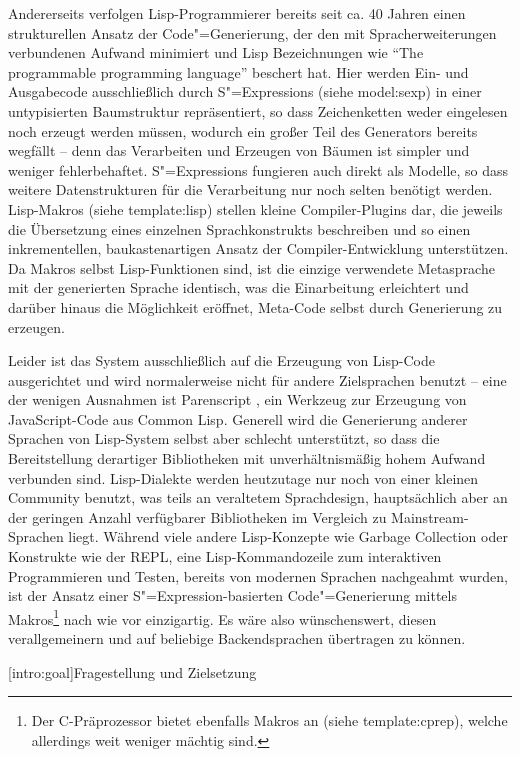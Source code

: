 \documentclass[12pt, a4paper, bibgerm]{scrbook}
\newcommand\lsection{}
\newcommand\sref{}
\newcommand{\sees}[1]{(siehe \sref{#1})}
\newcommand{\sexp}{S"=Expression}
\newcommand{\sexps}{S"=Expressions}
\newcommand{\cgen}{Code"=Generierung}
\begin{document}
Andererseits verfolgen Lisp-Programmierer bereits seit ca. 40
Jahren \cite{EvolutionOfLisp} einen strukturellen Ansatz der \cgen{}, der den
mit Spracherweiterungen verbundenen Aufwand minimiert und Lisp
Bezeichnungen wie "`The programmable programming
language"' \cite{Federano} beschert hat. Hier werden Ein- und Ausgabecode
ausschließlich durch \sexps{} \sees{model:sexp} in einer untypisierten
Baumstruktur repräsentiert, so dass Zeichenketten weder eingelesen noch
erzeugt werden müssen, wodurch ein großer Teil des Generators bereits
wegfällt -- denn das Verarbeiten und Erzeugen von Bäumen ist simpler und
weniger fehlerbehaftet. \sexps{} fungieren auch direkt als Modelle, so
dass weitere Datenstrukturen für die Verarbeitung nur noch selten
benötigt werden. Lisp-Makros \sees{template:lisp} stellen kleine
Compiler-Plugins dar, die jeweils die Übersetzung eines einzelnen
Sprachkonstrukts beschreiben und so einen inkrementellen,
baukastenartigen Ansatz der Compiler-Entwicklung unterstützen. Da Makros
selbst Lisp-Funktionen sind, ist die einzige verwendete Metasprache mit
der generierten Sprache identisch, was die Einarbeitung erleichtert und
darüber hinaus die Möglichkeit eröffnet, Meta-Code selbst durch
Generierung zu erzeugen.

Leider ist das System ausschließlich auf die Erzeugung von Lisp-Code
ausgerichtet und wird normalerweise nicht für andere Zielsprachen
benutzt -- eine der wenigen Ausnahmen ist Parenscript \cite{Parenscript},
ein Werkzeug zur Erzeugung von JavaScript-Code aus Common Lisp. Generell
wird die Generierung anderer Sprachen von Lisp-System selbst aber
schlecht unterstützt, so dass die Bereitstellung derartiger Bibliotheken
mit unverhältnismäßig hohem Aufwand verbunden sind. Lisp-Dialekte werden
heutzutage nur noch von einer kleinen Community benutzt, was teils an
veraltetem Sprachdesign, hauptsächlich aber an der geringen Anzahl
verfügbarer Bibliotheken im Vergleich zu Mainstream-Sprachen
liegt. Während viele andere Lisp-Konzepte wie Garbage Collection oder
Konstrukte wie der REPL, eine Lisp-Kommandozeile zum interaktiven
Programmieren und Testen, bereits von modernen Sprachen nachgeahmt
wurden, ist der Ansatz einer \sexp-basierten \cgen{} mittels
Makros\footnote{Der C-Präprozessor bietet ebenfalls Makros an
  \sees{template:cprep}, welche allerdings weit weniger mächtig sind.}
nach wie vor einzigartig. Es wäre also wünschenswert, diesen
verallgemeinern und auf beliebige Backendsprachen übertragen zu können.

\lsection[intro:goal]{Fragestellung und Zielsetzung}
\end{document}
